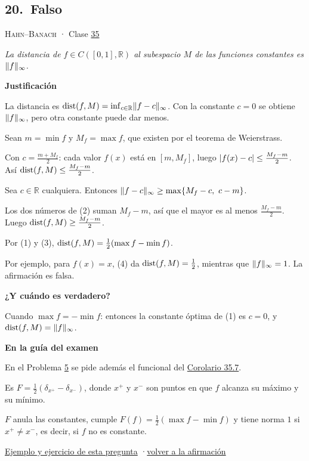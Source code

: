 \documentclass[11pt,a4paper]{article}
\newcommand{\R}{\mathbb{R}}\newcommand{\N}{\mathbb{N}}\newcommand{\Q}{\mathbb{Q}}
\newcommand{\bloque}[1]{\par\smallskip\noindent\textbf{\color{acento}#1}\par}
\begin{document}
\subsection*{\hypertarget{r-20}{}20.\ \textcolor{bad}{Falso}}
{\small \textsc{Hahn–Banach} · Clase \href{https://decostruttivismo.github.io/MAT2514-repaso/pdf/MAT2514_apuntes_completos.pdf\#nameddest=section.35}{35}}\par
\emph{La distancia de $f\in C([0,1],\R)$ al subespacio $M$ de las funciones constantes es $\lVert f\rVert_\infty$.}
\bloque{Justificación}
\begin{pasos}
\item[] La distancia es $\dist(f,M)=\inf_{c\in\R}\norm{f-c}_\infty$. Con la constante $c=0$ se obtiene $\lVert f\rVert_\infty$, pero otra constante puede dar menos.
\item[] Sean $m=\min f$ y $M_f=\max f$, que existen por el teorema de Weierstrass.
\item[(1)] Con $c=\frac{m+M_f}2$: cada valor $f(x)$ está en $[m,M_f]$, luego $\lvert f(x)-c\rvert\le\frac{M_f-m}2$. Así $\operatorname{dist}(f,M)\le\frac{M_f-m}2$.
\item[(2)] Sea $c\in\R$ cualquiera. Entonces $\norm{f-c}_\infty\ge\max\{M_f-c,\ c-m\}$.
\item[(3)] Los dos números de (2) suman $M_f-m$, así que el mayor es al menos $\frac{M_f-m}2$. Luego $\operatorname{dist}(f,M)\ge\frac{M_f-m}2$.
\item[(4)] Por (1) y (3), $\operatorname{dist}(f,M)=\frac12(\max f-\min f)$.
\item[] Por ejemplo, para $f(x)=x$, (4) da $\operatorname{dist}(f,M)=\frac12$, mientras que $\lVert f\rVert_\infty=1$. La afirmación es falsa.
\end{pasos}
\bloque{¿Y cuándo es verdadero?}
\begin{pasos}
\item[] Cuando $\max f=-\min f$: entonces la constante óptima de (1) es $c=0$, y $\operatorname{dist}(f,M)=\lVert f\rVert_\infty$.
\end{pasos}
\bloque{En la guía del examen}
\begin{pasos}
\item[] En el Problema \hyperlink{prob-5}{5} se pide además el funcional del \href{https://decostruttivismo.github.io/MAT2514-repaso/pdf/MAT2514_apuntes_completos.pdf\#nameddest=teorema.35.7}{Corolario 35.7}.
\item[] Es $F=\frac12(\delta_{x^+}-\delta_{x^-})$, donde $x^+$ y $x^-$ son puntos en que $f$ alcanza su máximo y su mínimo.
\item[] $F$ anula las constantes, cumple $F(f)=\frac12(\max f-\min f)$ y tiene norma $1$ si $x^+\ne x^-$, es decir, si $f$ no es constante.
\end{pasos}
\par{}
\par{\small \hyperlink{e-20}{Ejemplo y ejercicio de esta pregunta} \quad·\quad \hyperlink{q-20}{volver a la afirmación}}
\end{document}
